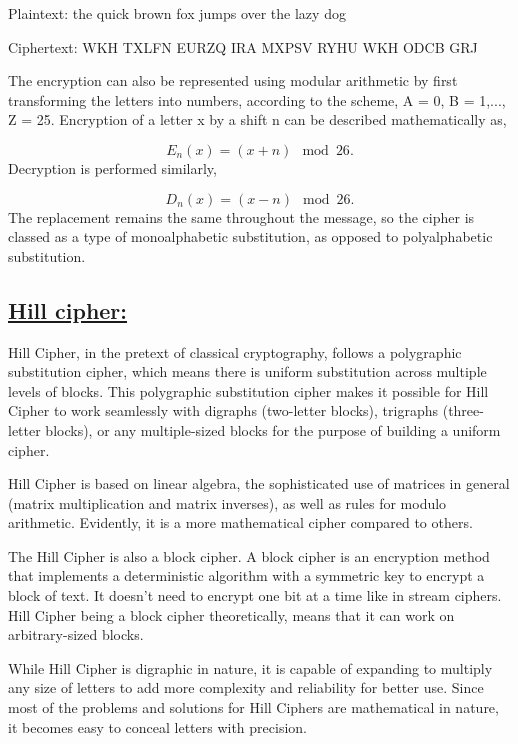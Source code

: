 \documentclass[a4paper,12pt]{article}
\begin{document}
    Plaintext: the quick brown fox jumps over the lazy dog


    Ciphertext: WKH TXLFN EURZQ IRA MXPSV RYHU WKH ODCB GRJ
    \vspace*{0.2cm}


    The encryption can also be represented using modular arithmetic by first transforming the letters into numbers, according to the scheme, A = 0, B = 1,..., Z = 25. Encryption of a letter x by a shift n can be described mathematically as,

    $$E_n(x) = (x + n) \mod {26}.$$
    Decryption is performed similarly,

    $$D_n(x) = (x - n) \mod {26}.$$
    The replacement remains the same throughout the message, so the cipher is classed as a type of monoalphabetic substitution, as opposed to polyalphabetic substitution.

    \subsection*{\underline{Hill cipher:}}

    Hill Cipher, in the pretext of classical cryptography, follows a polygraphic substitution cipher, which means there is uniform substitution across multiple levels of blocks. This polygraphic substitution cipher makes it possible for Hill Cipher to work seamlessly with digraphs (two-letter blocks), trigraphs (three-letter blocks), or any multiple-sized blocks for the purpose of building a uniform cipher.

   Hill Cipher is based on linear algebra, the sophisticated use of matrices in general (matrix multiplication and matrix inverses), as well as rules for modulo arithmetic. Evidently, it is a more mathematical cipher compared to others.

   The Hill Cipher is also a block cipher. A block cipher is an encryption method that implements a deterministic algorithm with a symmetric key to encrypt a block of text. It doesn't need to encrypt one bit at a time like in stream ciphers. Hill Cipher being a block cipher theoretically, means that it can work on arbitrary-sized blocks.

   While Hill Cipher is digraphic in nature, it is capable of expanding to multiply any size of letters to add more complexity and reliability for better use. Since most of the problems and solutions for Hill Ciphers are mathematical in nature, it becomes easy to conceal letters with precision.
\end{document}
